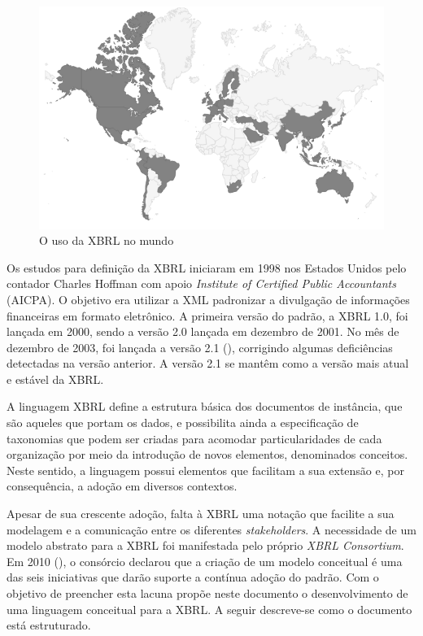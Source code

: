 \documentclass[msc,proposal]{ppgccufmg} %
\begin{document}
\begin{figure}[hbtp]
\centering
\includegraphics[width=.75\textwidth]{img/world-map.png}
\caption{O uso da XBRL no mundo}
\label{fig:world_map}
\end{figure}

Os estudos para definição da XBRL iniciaram em 1998 nos Estados Unidos pelo contador Charles Hoffman com apoio \textit{Institute of Certified Public Accountants} (AICPA). O objetivo era utilizar a XML padronizar a divulgação de informações financeiras em formato eletrônico. A primeira versão do padrão, a XBRL 1.0, foi lançada em 2000, sendo a versão 2.0 lançada em dezembro de 2001. No mês de dezembro de 2003, foi lançada a versão 2.1 (\cite{hoffman_2006}), corrigindo algumas deficiências detectadas na versão anterior. A versão 2.1 se mantêm como a versão mais atual e estável da XBRL.

A linguagem XBRL define a estrutura básica dos documentos de instância, que são aqueles que portam os dados, e possibilita ainda a especificação de taxonomias que podem ser criadas para acomodar particularidades de cada organização por meio da introdução de novos elementos, denominados conceitos. Neste sentido, a linguagem possui elementos que facilitam a sua extensão e, por consequência, a adoção em diversos contextos.

Apesar de sua crescente adoção, falta à XBRL uma notação que facilite a sua modelagem e a comunicação entre os diferentes \textit{stakeholders}. A necessidade de um modelo abstrato para a XBRL foi manifestada pelo próprio \textit{XBRL Consortium}. Em 2010 (\cite{xbrl_preserve_promote_particite}), o consórcio declarou que a criação de um modelo conceitual é uma das seis iniciativas que darão suporte a contínua adoção do padrão. Com o objetivo de preencher esta lacuna propõe neste documento o desenvolvimento de uma linguagem conceitual para a XBRL. A seguir descreve-se como o documento está estruturado.
\end{document}
